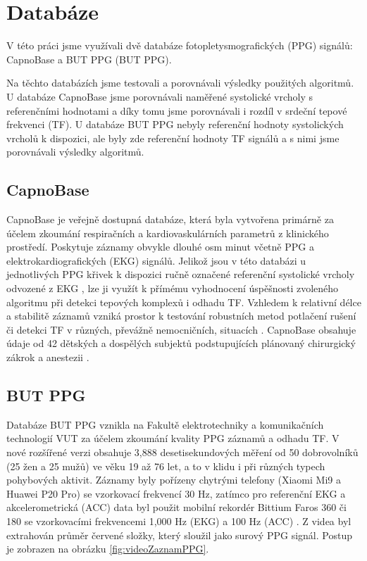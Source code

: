 \raggedbottom
\chapter{Databáze}

V této práci jsme využívali dvě databáze fotopletysmografických (\acs{PPG}) signálů: CapnoBase a \acl{BUT PPG} (BUT PPG).

Na těchto databázích jsme testovali a porovnávali výsledky použitých algoritmů.
U databáze CapnoBase jsme porovnávali naměřené systolické vrcholy s referenčními hodnotami a díky tomu jsme porovnávali i rozdíl v srdeční tepové frekvenci (\acs{TF}).
U databáze \acs{BUT PPG} nebyly referenční hodnoty systolických vrcholů k dispozici, ale byly zde referenční hodnoty \acs{TF} signálů a s nimi jsme porovnávali výsledky algoritmů.

\section{CapnoBase}

CapnoBase je veřejně dostupná databáze, která byla vytvořena primárně za účelem zkoumání respiračních a kardiovaskulárních parametrů z klinického prostředí.
Poskytuje záznamy obvykle dlouhé osm minut včetně \acs{PPG} a elektrokardiografických (EKG) signálů.
Jelikož jsou v této databázi u jednotlivých \acs{PPG} křivek k dispozici ručně označené referenční systolické vrcholy odvozené z EKG \cite{CapnoBase},
lze ji využít k přímému vyhodnocení úspěšnosti zvoleného algoritmu při detekci tepových komplexů i odhadu \acs{TF}.
Vzhledem k relativní délce a stabilitě záznamů vzniká prostor k testování robustních metod potlačení rušení či detekci \acs{TF} v různých, převážně nemocničních, situacích \cite{Karlen2013, Charlton2022}.
CapnoBase obsahuje údaje od 42 dětských a dospělých subjektů podstupujících plánovaný chirurgický zákrok a anestezii \cite{Charlton2022}.

\section{\acs{BUT PPG}}
Databáze \acs{BUT PPG} vznikla na Fakultě elektrotechniky a komunikačních technologií \acs{VUT} za účelem zkoumání kvality \acs{PPG} záznamů a odhadu \acs{TF}.
V nové rozšířené verzi obsahuje 3,888 desetisekundových měření od 50 dobrovolníků (25 žen a 25 mužů) ve věku 19 až 76 let, a to v klidu i při různých typech pohybových aktivit.
Záznamy byly pořízeny chytrými telefony (Xiaomi Mi9 a Huawei P20 Pro) se vzorkovací frekvencí 30 Hz, zatímco pro referenční EKG a akcelerometrická (ACC) data byl použit mobilní rekordér Bittium Faros 360 či 180 se vzorkovacími frekvencemi 1,000 Hz (EKG) a 100 Hz (ACC) \cite{BUT_PPG}.
Z videa byl extrahován průměr červené složky, který sloužil jako surový \acs{PPG} signál.
Postup je zobrazen na obrázku \ref{fig:videoZaznamPPG}.


